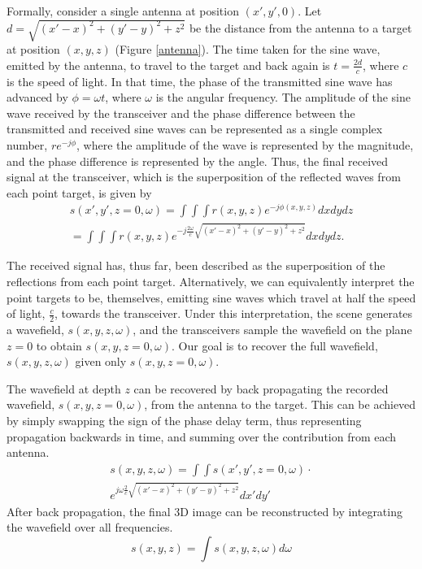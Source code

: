 \documentclass[twocolumn]{article}
\begin{document}
Formally, consider a single antenna at position $(x', y', 0)$. Let $d = \sqrt{(x'-x)^2+(y'-y)^2+z^2}$ be the distance from the antenna to a target at position $(x,y,z)$ (Figure \ref{antenna}). The time taken for the sine wave, emitted by the antenna, to travel to the target and back again is $t = \frac{2d}{c}$, where $c$ is the speed of light. In that time, the phase of the transmitted sine wave has advanced by $\phi = \omega t$, where $\omega$ is the angular frequency. The amplitude of the sine wave received by the transceiver and the phase difference between the transmitted and received sine waves can be represented as a single complex number, $r e^{-j \phi}$, where the amplitude of the wave is represented by the magnitude, and the phase difference is represented by the angle. Thus, the final received signal at the transceiver, which is the superposition of the reflected waves from each point target, is given by
%
\begin{gather}
s(x', y', z=0, \omega) = \int \int \int r(x,y,z) e^{-j \phi(x,y,z)} dx dy dz \nonumber \\
= \int \int \int r(x,y,z) e^{-j \frac{2\omega}{c} \sqrt{(x'-x)^2 + (y'-y)^2 + z^2}} dx dy dz.
\end{gather}

The received signal has, thus far, been described as the superposition of the reflections from each point target. Alternatively, we can equivalently interpret the point targets to be, themselves, emitting sine waves which travel at half the speed of light, $\frac{c}{2}$, towards the transceiver. Under this interpretation, the scene generates a wavefield, $s(x,y,z,\omega)$, and the transceivers sample the wavefield on the plane $z=0$ to obtain $s(x,y,z=0,\omega)$. Our goal is to recover the full wavefield, $s(x,y,z,\omega)$ given only $s(x,y,z=0,\omega)$.

The wavefield at depth $z$ can be recovered by back propagating the recorded wavefield, $s(x, y, z=0, \omega)$, from the antenna to the target. This can be achieved by simply swapping the sign of the phase delay term, thus representing propagation backwards in time, and summing over the contribution from each antenna.
%
\begin{gather}
s(x,y,z,\omega) =\int\int s(x',y',z=0,\omega) \cdot \nonumber \\
e^{j \omega \frac{2}{c} \sqrt{(x'-x)^{2}+(y'-y)^{2}+z^{2}}} dx'dy'
\label{sxyzw}
\end{gather}
%
After back propagation, the final 3D image can be reconstructed by integrating the wavefield over all frequencies.
\begin{equation}
s(x,y,z)=\int s(x,y,z,\omega) d\omega
\end{equation}
\end{document}
